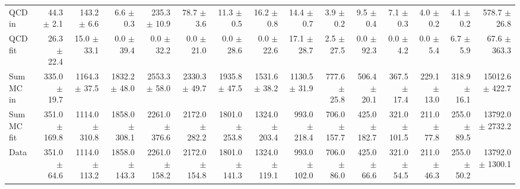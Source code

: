 \begin{table}[htbp]
{\begin{tabular}{lrrrrrrrrrrrrrr}
\hline
QCD in & 44.3 $\pm$ 2.1 & 143.2 $\pm$ 6.6 & 6.6 $\pm$ 0.3 & 235.3 $\pm$ 10.9 & 78.7 $\pm$ 3.6 & 11.3 $\pm$ 0.5 & 16.2 $\pm$ 0.8 & 14.4 $\pm$ 0.7 & 3.9 $\pm$ 0.2 & 9.5 $\pm$ 0.4 & 7.1 $\pm$ 0.3 & 4.0 $\pm$ 0.2 & 4.1 $\pm$ 0.2 & 578.7 $\pm$ 26.8 \\
QCD fit & 26.3 $\pm$ 22.4 & 15.0 $\pm$ 33.1 & 0.0 $\pm$ 39.4 & 0.0 $\pm$ 32.2 & 0.0 $\pm$ 21.0 & 0.0 $\pm$ 28.6 & 0.0 $\pm$ 22.6 & 17.1 $\pm$ 28.7 & 2.5 $\pm$ 27.5 & 0.0 $\pm$ 92.3 & 0.0 $\pm$ 4.2 & 0.0 $\pm$ 5.4 & 6.7 $\pm$ 5.9 & 67.6 $\pm$ 363.3 \\
\hline
Sum MC in & 335.0 $\pm$ 19.7 & 1164.3 $\pm$ 37.5 & 1832.2 $\pm$ 48.0 & 2553.3 $\pm$ 58.0 & 2330.3 $\pm$ 49.7 & 1935.8 $\pm$ 47.5 & 1531.6 $\pm$ 38.2 & 1130.5 $\pm$ 31.9 & 777.6 $\pm$ 25.8 & 506.4 $\pm$ 20.1 & 367.5 $\pm$ 17.4 & 229.1 $\pm$ 13.0 & 318.9 $\pm$ 16.1& 15012.6 $\pm$ 422.7 \\
Sum MC fit & 351.0 $\pm$ 169.8 & 1114.0 $\pm$ 310.8 & 1858.0 $\pm$ 308.1 & 2261.0 $\pm$ 376.6 & 2172.0 $\pm$ 282.2 & 1801.0 $\pm$ 253.8 & 1324.0 $\pm$ 203.4 & 993.0 $\pm$ 218.4 & 706.0 $\pm$ 157.7 & 425.0 $\pm$ 182.7 & 321.0 $\pm$ 101.5 & 211.0 $\pm$ 77.8 & 255.0 $\pm$ 89.5 & 13792.0 $\pm$ 2732.2 \\
\hline
Data & 351.0 $\pm$ 64.6 & 1114.0 $\pm$ 113.2 & 1858.0 $\pm$ 143.3 & 2261.0 $\pm$ 158.2 & 2172.0 $\pm$ 154.8 & 1801.0 $\pm$ 141.3 & 1324.0 $\pm$ 119.1 & 993.0 $\pm$ 102.0 & 706.0 $\pm$ 86.0 & 425.0 $\pm$ 66.6 & 321.0 $\pm$ 54.5 & 211.0 $\pm$ 46.3 & 255.0 $\pm$ 50.2 & 13792.0 $\pm$ 1300.1 \\
\hline
\end{tabular}
}
\end{table}
